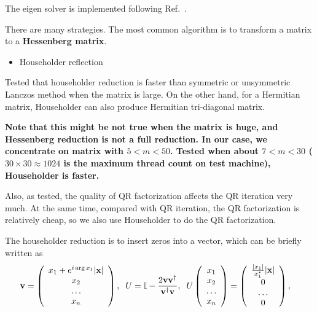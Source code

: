 The eigen solver is implemented following Ref.~\cite{matrixcomputation}.

There are many strategies. The most common algorithm is to transform a matrix to a \textbf{Hessenberg matrix}.

\begin{itemize}
  \item {}Householder reflection
\end{itemize}

Tested that householder reduction is faster than symmetric or unsymmetric Lanczos method when the matrix is large. On the other hand, for a Hermitian matrix, Householder can also produce Hermitian tri-diagonal matrix.

\textbf{Note that this might be not true when the matrix is huge, and Hessenberg reduction is not a full reduction. In our case, we concentrate on matrix with $5<m<50$. Tested when about $7<m<30$ ($30 \times 30 \approx 1024$ is the maximum thread count on test machine), Householder is faster.}

Also, as tested, the quality of QR factorization affects the QR iteration very much. At the same time, compared with QR iteration, the QR factorization is relatively cheap, so we also use Householder to do the QR factorization.

The householder reduction is to insert zeros into a vector, which can be briefly written as
\begin{equation}
\begin{split}
&{\bf v}=\left(\begin{array}{c} x_1+e^{i \arg{x_1}}|{\bf x}|\\x_2\\ \ldots \\ x_n\end{array}\right),\;\;U=\mathbb{I}-\frac{2{\bf v}{\bf v}^{\dagger}}{{\bf v}^{\dagger}{\bf v}},\;\;U\left(\begin{array}{c} x_1\\x_2\\ \ldots \\ x_n\end{array}\right)=\left(\begin{array}{c} \frac{|x_1|}{x_1^*}|{\bf x}|\\0\\ \ldots \\ 0\end{array}\right),
\end{split}
\end{equation}

